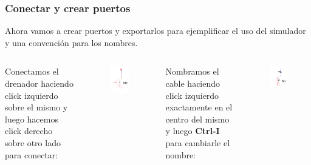 \documentclass{beamer}
\begin{document}
\begin{frame}
\frametitle{Conectar y crear puertos}
Ahora vamos a crear puertos y exportarlos para ejemplificar el uso del simulador y una convención para los nombres.
\vspace{0.5cm}
\begin{columns}[t]
Conectamos el drenador haciendo click izquierdo sobre el mismo y luego hacemos click derecho sobre otro lado para conectar:
\begin{figure}
\includegraphics[width=0.45\linewidth]{figuras/edicionElectric-4.png}
\end{figure}
Nombramos el cable haciendo click izquierdo exactamente en el centro del mismo y luego \textbf{Ctrl-I} para cambiarle el nombre:
\begin{figure}
\includegraphics[width=0.45\linewidth]{figuras/edicionElectric-4b.png}
\end{figure}
\end{columns}
\end{frame}
\end{document}
